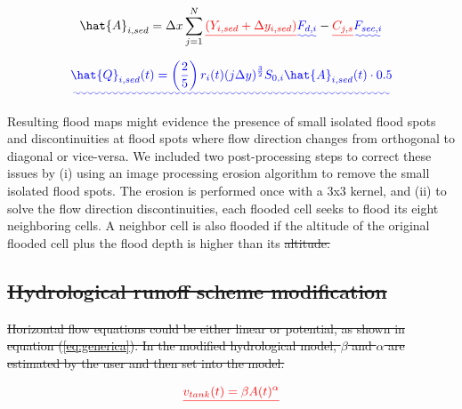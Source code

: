 \documentclass[hess, manuscript]{copernicus} %
\providecommand{\DIFadd}[1]{{\protect\color{blue}\uwave{#1}}} %
\providecommand{\DIFdel}[1]{{\protect\color{red}\sout{#1}}}                      %
\providecommand{\DIFaddbegin}{} %
\providecommand{\DIFaddend}{} %
\providecommand{\DIFdelbegin}{} %
\providecommand{\DIFdelend}{} %
\begin{document}
 \DIFaddend \begin{equation}
  \hat{A}_{i,sed} = \Delta x \sum_{j=1}^{N} \DIFdelbegin \DIFdel{(Y_{i,sed}+\Delta y_{i,sed}) }\DIFdelend \DIFaddbegin \DIFadd{F_{d,i} }\DIFaddend - \DIFdelbegin \DIFdel{C_{j,s} 
  }\DIFdelend \DIFaddbegin \DIFadd{F_{sec,i} 
  }\DIFaddend \label{eq:differencia}
 \end{equation}

 \DIFaddbegin \begin{equation}
   \DIFadd{\hat{Q}_{i,sed}(t) = \left( \frac{2}{5} \right) r_i(t)(j \Delta y)^{\frac{3}{2}} S_{0,i} \hat{A}_{i,sed}(t) \cdot 0.5
 \label{eq:constitutiva} 
 }\end{equation}

\DIFaddend Resulting flood maps might evidence the presence of small isolated flood spots and discontinuities at flood spots where flow direction changes from orthogonal to diagonal or vice-versa.  We included two post-processing steps to correct these issues by  (i) using an image processing erosion algorithm \DIFaddbegin \DIFadd{\mbox{%
\citep{Serra1983} }\hspace{0pt}%
}\DIFaddend to remove the small isolated flood spots. The erosion is performed once with a 3x3 kernel, and (ii) to solve the flow direction discontinuities, each flooded cell seeks to flood its eight neighboring cells.  A neighbor cell is also flooded if the altitude of the original flooded cell plus the flood depth is higher than its \DIFdelbegin \DIFdel{altitude.}%

\subsection{\DIFdel{Hydrological runoff scheme modification}}
\addtocounter{subsection}{-1}%

\DIFdel{Horizontal flow equations could be either linear or potential, as shown in equation (\ref{eq:generica}). In the modified hydrological model, $\beta$ and $\alpha$ are estimated by the user and then set into the model. }%

\begin{displaymath}
 \DIFdel{v_{tank}(t) = \beta A(t) ^{\alpha}
}\end{displaymath}
\end{document}
